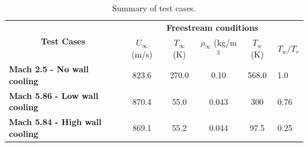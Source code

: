 \documentclass[journal ]{new-aiaa}
\begin{document}


\begin{table}
\centering
\caption{Summary of test cases.}
\label{tbl:test-cases}
\begin{tabular}{|l|ccccl|}
\hline
\multicolumn{1}{|c|}{\multirow{2}{*}{\textbf{Test Cases}}} &
  \multicolumn{5}{c|}{\textbf{Freestream conditions}} \\ \cline{2-6} 
\multicolumn{1}{|c|}{} &
  \multicolumn{1}{c|}{$U_\infty$ (m/s)} &
  \multicolumn{1}{c|}{$T_\infty$ (K)} &
  \multicolumn{1}{c|}{$\rho_\infty$ (kg/m$^3$} &
  \multicolumn{1}{c|}{$T_{w}$ (K)} &
  \textbf{$T_{w}/T_{r}$} \\ \hline
\textbf{Mach 2.5 - No wall cooling} &
  \multicolumn{1}{c|}{823.6} &
  \multicolumn{1}{c|}{270.0} &
  \multicolumn{1}{c|}{0.10} &
  \multicolumn{1}{c|}{568.0} &
  1.0 \\ \hline
\textbf{Mach 5.86 - Low wall cooling} &
  \multicolumn{1}{c|}{870.4} &
  \multicolumn{1}{c|}{55.0} &
  \multicolumn{1}{c|}{0.043} &
  \multicolumn{1}{c|}{300} &
  0.76 \\ \hline
\textbf{Mach 5.84 - High wall cooling} &
  \multicolumn{1}{c|}{869.1} &
  \multicolumn{1}{c|}{55.2} &
  \multicolumn{1}{c|}{0.044} &
  \multicolumn{1}{c|}{97.5} &
  0.25 \\ \hline
\end{tabular}
\end{table}
\end{document}
